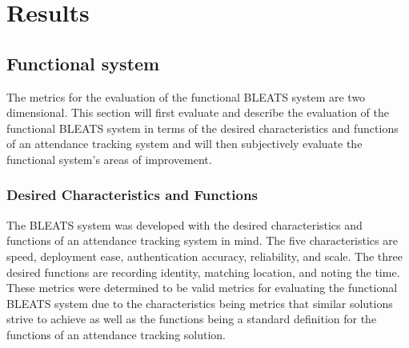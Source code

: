 \section{Results}

\label{sec:results}


\subsection{Functional system}

The metrics for the evaluation of the functional BLEATS system are two
dimensional. This section will first evaluate and describe the evaluation of
the functional BLEATS system in terms of the desired characteristics and
functions of an attendance tracking system and will then subjectively evaluate
the functional system’s areas of improvement.

\subsubsection{Desired Characteristics and Functions}

The BLEATS system was developed with the desired characteristics and functions
of an attendance tracking system in mind. The five characteristics are speed,
deployment ease, authentication accuracy, reliability, and scale. The three
desired functions are recording identity, matching location, and noting the
time. These metrics were determined to be valid metrics for evaluating the
functional BLEATS system due to the characteristics being metrics that similar
solutions strive to achieve as well as the functions being a standard
definition for the functions of an attendance tracking solution.

